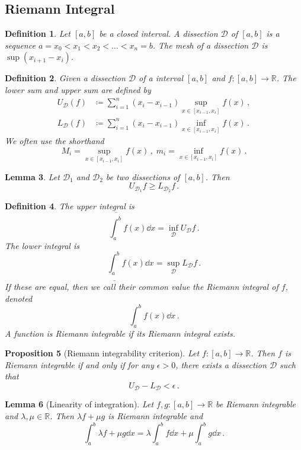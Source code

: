 \documentclass{article}
\theoremstyle{plain}\theoremheaderfont{\normalfont\itshape}\theorembodyfont{\rmfamily}\theoremseparator{.}\newtheorem*{rem}{Remark}\newtheorem*{ex}{Example}\newtheorem*{proof}{Proof}\newtheorem*{altp}{Alternative proof}
\theoremstyle{plain}\theoremheaderfont{\normalfont\bfseries}\theorembodyfont{\rmfamily}\theoremseparator{.}\newtheorem{thm}{Theorem}[section]\newtheorem{lem}[thm]{Lemma}\newtheorem{prop}[thm]{Proposition}\newtheorem*{cor}{Corollary}\newtheorem{defn}[thm]{Definition}\newtheorem{clm}[thm]{Claim}\newtheorem{clminproof}{Claim}
\theoremstyle{break}\theoremheaderfont{\normalfont\itshape}\theorembodyfont{\rmfamily}\theoremseparator{.\medskip}\newtheorem*{proofskip}{Proof}\newtheorem*{exs}{Examples}\newtheorem*{rems}{Remarks}
\theoremstyle{break}\theoremheaderfont{\normalfont\bfseries}\theorembodyfont{\rmfamily}\theoremseparator{.\medskip}\newtheorem{lemskip}[thm]{Lemma}\newtheorem{defnskip}[thm]{Definition}\newtheorem{propskip}[thm]{Proposition}\newtheorem{thmskip}[thm]{Theorem}
\begin{document}
    \subsection{Riemann Integral}
    \begin{defn}
        Let \([a,b]\) be a closed interval. A \textit{dissection} \(\mathcal{D}\) of \([a,b]\) is a sequence \(a=x_0<x_1<x_2<\dots<x_n=b\). The \textit{mesh} of a dissection \(\mathcal{D}\) is \(\sup(x_{i+1}-x_i)\).
    \end{defn}
    \begin{defn}
        Given a dissection \(\mathcal{D}\) of a interval \([a,b]\) and \(f:[a,b]\to\mathbb{R}\). The \textit{lower sum} and \textit{upper sum} are defined by
        \begin{align*}
            U_\mathcal{D}(f)&\coloneqq \sum_{i=1}^{n}(x_i-x_{i-1})\sup_{x\in[x_{i-1},x_i]}f(x)\,,\\
            L_\mathcal{D}(f)&\coloneqq \sum_{i=1}^{n}(x_i-x_{i-1})\inf_{x\in[x_{i-1},x_i]}f(x)\,.
        \end{align*}
        We often use the shorthand
        \[M_i=\sup_{x\in[x_{i-1},x_i]}f(x)\,,\;m_i=\inf_{x\in[x_{i-1},x_i]}f(x)\,.\]
    \end{defn}
    \begin{lem}
        Let \(\mathcal{D}_1\) and \(\mathcal{D}_2\) be two dissections of \([a,b]\). Then
        \[U_{\mathcal{D}_1}f\ge L_{\mathcal{D}_2}f\,.\]
    \end{lem}
    \begin{defn}
        The \textit{upper integral} is
        \[\overline{\int_{a}^{b}}f(x)\dd{x}=\inf_{\mathcal{D}}U_{\mathcal{D}}f\,.\]
        The \textit{lower integral} is
        \[\underline{\int_{a}^{b}}f(x)\dd{x}=\sup_{\mathcal{D}}L_{\mathcal{D}}f\,.\]
        If these are equal, then we call their common value the \textit{Riemann integral} of \(f\), denoted
        \[\int_{a}^{b}f(x)\dd{x}\,.\]
        A function is \textit{Riemann integrable} if its Riemann integral exists.
    \end{defn}
    \begin{prop}[Riemann integrability criterion]
        Let \(f:[a,b]\to\mathbb{R}\). Then \(f\) is Riemann integrable if and only if for any \(\epsilon>0\), there exists a dissection \(\mathcal{D}\) such that
        \[U_{\mathcal{D}}-L_{\mathcal{D}}<\epsilon\,.\]
    \end{prop}
    \begin{lem}[Linearity of integration]
        Let \(f,g:[a,b]\to\mathbb{R}\) be Riemann integrable and \(\lambda,\mu\in\mathbb{R}\). Then \(\lambda f+\mu g\) is Riemann integrable and
        \[\int_{a}^{b}\lambda f+\mu g\dd{x}=\lambda\int_{a}^{b}f\dd{x}+\mu\int_{a}^{b}g\dd{x}\,.\]
    \end{lem}
\end{document}
